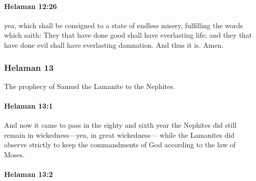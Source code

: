 		\paragraph{Helaman 12:26} %
			\label{HELAMAN-12-26}

			yea, which shall be consigned to a state of endless misery,
			fulfilling the words which saith:
			They that have done good shall have everlasting life;
			and they that have done evil shall have everlasting damnation.
			And thus it is.
			Amen.

	\subsubsection{Helaman 13} %
		\label{HELAMAN-13}
		
		The prophecy of Samuel the Lamanite to the Nephites.
		
		\paragraph{Helaman 13:1} %
			\label{HELAMAN-13-1}

			And now it came to pass in the eighty and sixth year
			the Nephites did still remain in wickedness---yea, in great wickedness---
			while the Lamanites did observe strictly to keep the commandments of God
			according to the law of Moses.

		\paragraph{Helaman 13:2} %
			\label{HELAMAN-13-2}

